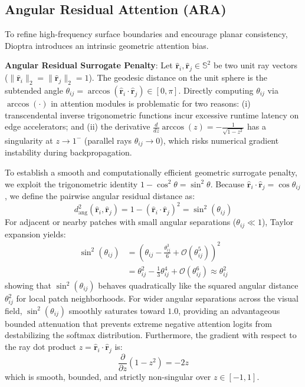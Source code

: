 \subsection{Angular Residual Attention (ARA)}
To refine high-frequency surface boundaries and encourage planar consistency, Dioptra introduces an intrinsic geometric attention bias. 

\noindent\textbf{Angular Residual Surrogate Penalty}: Let $\hat{\mathbf{r}}_i, \hat{\mathbf{r}}_j \in \mathbb{S}^2$ be two unit ray vectors ($\|\hat{\mathbf{r}}_i\|_2 = \|\hat{\mathbf{r}}_j\|_2 = 1$). The geodesic distance on the unit sphere is the subtended angle $\theta_{ij} = \arccos(\hat{\mathbf{r}}_i \cdot \hat{\mathbf{r}}_j) \in [0, \pi]$. Directly computing $\theta_{ij}$ via $\arccos(\cdot)$ in attention modules is problematic for two reasons: (i) transcendental inverse trigonometric functions incur excessive runtime latency on edge accelerators; and (ii) the derivative $\frac{d}{dz}\arccos(z) = -\frac{1}{\sqrt{1 - z^2}}$ has a singularity at $z \to 1^-$ (parallel rays $\theta_{ij} \to 0$), which risks numerical gradient instability during backpropagation.

To establish a smooth and computationally efficient geometric surrogate penalty, we exploit the trigonometric identity $1 - \cos^2\theta = \sin^2\theta$. Because $\hat{\mathbf{r}}_i \cdot \hat{\mathbf{r}}_j = \cos\theta_{ij}$, we define the pairwise angular residual distance as:
\begin{equation}
    d_{\text{ang}}^2(\hat{\mathbf{r}}_i, \hat{\mathbf{r}}_j) = 1 - (\hat{\mathbf{r}}_i \cdot \hat{\mathbf{r}}_j)^2 = \sin^2(\theta_{ij})
    \label{eq:ara_derivation}
\end{equation}
For adjacent or nearby patches with small angular separations ($\theta_{ij} \ll 1$), Taylor expansion yields:
\begin{equation}
\begin{aligned}
    \sin^2(\theta_{ij}) &= \left(\theta_{ij} - \frac{\theta_{ij}^3}{6} + \mathcal{O}(\theta_{ij}^5)\right)^2 \\
    &= \theta_{ij}^2 - \frac{1}{3}\theta_{ij}^4 + \mathcal{O}(\theta_{ij}^6) \approx \theta_{ij}^2
\end{aligned}
\end{equation}
showing that $\sin^2(\theta_{ij})$ behaves quadratically like the squared angular distance $\theta_{ij}^2$ for local patch neighborhoods. For wider angular separations across the visual field, $\sin^2(\theta_{ij})$ smoothly saturates toward $1.0$, providing an advantageous bounded attenuation that prevents extreme negative attention logits from destabilizing the softmax distribution. Furthermore, the gradient with respect to the ray dot product $z = \hat{\mathbf{r}}_i \cdot \hat{\mathbf{r}}_j$ is:
\begin{equation}
    \frac{\partial}{\partial z} \left( 1 - z^2 \right) = -2z
\end{equation}
which is smooth, bounded, and strictly non-singular over $z \in [-1, 1]$.

